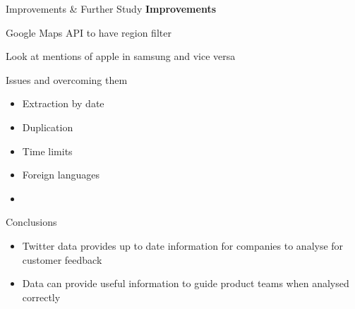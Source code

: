 \documentclass[
  ignorenonframetext,
]{beamer}
\providecommand{\tightlist}{%
  \setlength{\itemsep}{0pt}\setlength{\parskip}{0pt}}
\begin{document}
\begin{frame}{Improvements \& Further Study}
\protect\hypertarget{improvements-further-study}{}
\textbf{Improvements}

Google Maps API to have region filter

Look at mentions of apple in samsung and vice versa
\end{frame}

\begin{frame}{Issues and overcoming them}
\protect\hypertarget{issues-and-overcoming-them}{}
\begin{itemize}
\tightlist
\item
  Extraction by date
\item
  Duplication
\item
  Time limits
\item
  Foreign languages
\item
\end{itemize}
\end{frame}

\begin{frame}{Conclusions}
\protect\hypertarget{conclusions}{}
\begin{itemize}
\item
  Twitter data provides up to date information for companies to analyse
  for customer feedback
\item
  Data can provide useful information to guide product teams when
  analysed correctly
\end{itemize}
\end{frame}
\end{document}

